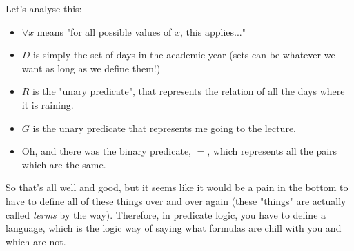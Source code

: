 Let's analyse this:
\begin{itemize}
    \item \textbf{$\forall x$} means "for all possible values of $x$, this applies..."
    \item \textbf{$D$} is simply the set of days in the academic year (sets can be whatever we want as long as we define them!)
    \item \textbf{$R$} is the "unary predicate", that represents the relation of all the days where it is raining.
    \item \textbf{$G$} is the unary predicate that represents me going to the lecture.
    \item Oh, and there was the binary predicate, $=$, which represents all the pairs which are the same.
\end{itemize}

So that's all well and good, but it seems like it would be a pain in the bottom to have to define all of these things over and over again (these "things" are actually called \textit{terms} by the way). Therefore, in predicate logic, you have to define a language, which is the logic way of saying what formulas are chill with you and which are not.
